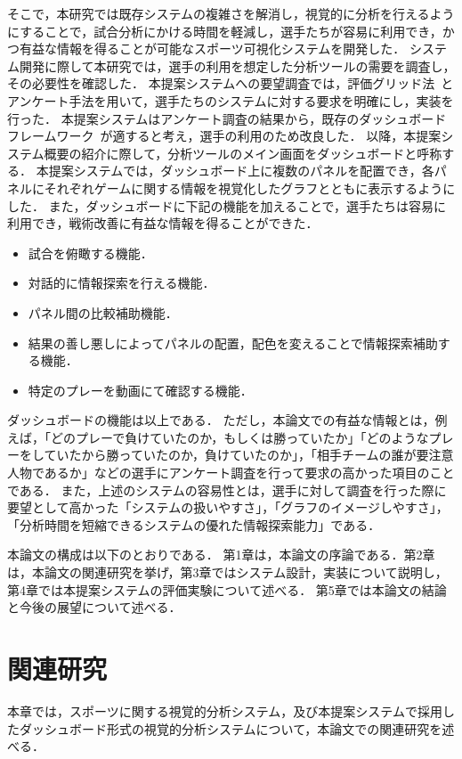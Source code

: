 \documentclass[sotsuron]{kuee}
\begin{document}
	そこで，本研究では既存システムの複雑さを解消し，視覚的に分析を行えるようにすることで，試合分析にかける時間を軽減し，選手たちが容易に利用でき，かつ有益な情報を得ることが可能なスポーツ可視化システムを開発した．
	システム開発に際して本研究では，選手の利用を想定した分析ツールの需要を調査し，その必要性を確認した．
	本提案システムへの要望調査では，評価グリッド法~\cite{EGM}とアンケート手法を用いて，選手たちのシステムに対する要求を明確にし，実装を行った．
	本提案システムはアンケート調査の結果から，既存のダッシュボードフレームワーク~\cite{dashboard}が適すると考え，選手の利用のため改良した．
	以降，本提案システム概要の紹介に際して，分析ツールのメイン画面をダッシュボードと呼称する．
	本提案システムでは，ダッシュボード上に複数のパネルを配置でき，各パネルにそれぞれゲームに関する情報を視覚化したグラフとともに表示するようにした．
	また，ダッシュボードに下記の機能を加えることで，選手たちは容易に利用でき，戦術改善に有益な情報を得ることができた．
		\begin{itemize}
			\item 試合を俯瞰する機能．
			\item 対話的に情報探索を行える機能．
			\item パネル間の比較補助機能．
			\item 結果の善し悪しによってパネルの配置，配色を変えることで情報探索補助する機能．
			\item 特定のプレーを動画にて確認する機能．
		\end{itemize}
	ダッシュボードの機能は以上である．
	ただし，本論文での有益な情報とは，例えば，「どのプレーで負けていたのか，もしくは勝っていたか」「どのようなプレーをしていたから勝っていたのか，負けていたのか」，「相手チームの誰が要注意人物であるか」などの選手にアンケート調査を行って要求の高かった項目のことである．
	また，上述のシステムの容易性とは，選手に対して調査を行った際に要望として高かった「システムの扱いやすさ」，「グラフのイメージしやすさ」，「分析時間を短縮できるシステムの優れた情報探索能力」である．
	
	本論文の構成は以下のとおりである．
	第1章は，本論文の序論である．第2章は，本論文の関連研究を挙げ，第3章ではシステム設計，実装について説明し，第4章では本提案システムの評価実験について述べる．
	第5章では本論文の結論と今後の展望について述べる．

\chapter{関連研究}
	本章では，スポーツに関する視覚的分析システム，及び本提案システムで採用したダッシュボード形式の視覚的分析システムについて，本論文での関連研究を述べる．
	
\end{document}
